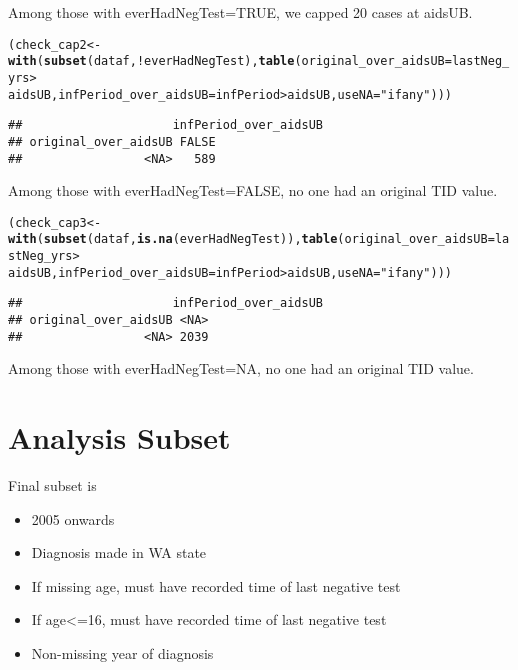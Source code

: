 \documentclass{article}\usepackage[]{graphicx}\usepackage[]{color}
\makeatletter
\newcommand{\hlstr}[1]{\textcolor[rgb]{0.192,0.494,0.8}{#1}}%
\newcommand{\hlopt}[1]{\textcolor[rgb]{0,0,0}{#1}}%
\newcommand{\hlstd}[1]{\textcolor[rgb]{0.345,0.345,0.345}{#1}}%
\newcommand{\hlkwb}[1]{\textcolor[rgb]{0.69,0.353,0.396}{#1}}%
\newcommand{\hlkwc}[1]{\textcolor[rgb]{0.333,0.667,0.333}{#1}}%
\newcommand{\hlkwd}[1]{\textcolor[rgb]{0.737,0.353,0.396}{\textbf{#1}}}%
\newenvironment{kframe}{%
 \def\at@end@of@kframe{}%
 \ifinner\ifhmode%
  \def\at@end@of@kframe{\end{minipage}}%
  \begin{minipage}{\columnwidth}%
 \fi\fi%
 \def\FrameCommand##1{\hskip\@totalleftmargin \hskip-\fboxsep
 \colorbox{shadecolor}{##1}\hskip-\fboxsep
     \hskip-\linewidth \hskip-\@totalleftmargin \hskip\columnwidth}%
 \MakeFramed {\advance\hsize-\width
   \@totalleftmargin\z@ \linewidth\hsize
   \@setminipage}}%
 {\par\unskip\endMakeFramed%
 \at@end@of@kframe}
\newenvironment{knitrout}{}{} %
\makeatother
\begin{document}
Among those with everHadNegTest=TRUE, we capped 20 cases at aidsUB.

\begin{knitrout}
\color{fgcolor}\begin{kframe}
\begin{alltt}
\hlstd{(check_cap2} \hlkwb{<-} \hlkwd{with}\hlstd{(}\hlkwd{subset}\hlstd{(dataf,} \hlopt{!}\hlstd{everHadNegTest),} \hlkwd{table}\hlstd{(}\hlkwc{original_over_aidsUB} \hlstd{= lastNeg_yrs} \hlopt{>}
    \hlstd{aidsUB,} \hlkwc{infPeriod_over_aidsUB} \hlstd{= infPeriod} \hlopt{>} \hlstd{aidsUB,} \hlkwc{useNA} \hlstd{=} \hlstr{"ifany"}\hlstd{)))}
\end{alltt}
\begin{verbatim}
##                     infPeriod_over_aidsUB
## original_over_aidsUB FALSE
##                 <NA>   589
\end{verbatim}
\end{kframe}
\end{knitrout}

Among those with everHadNegTest=FALSE, no one had an original TID value.

\begin{knitrout}
\color{fgcolor}\begin{kframe}
\begin{alltt}
\hlstd{(check_cap3} \hlkwb{<-} \hlkwd{with}\hlstd{(}\hlkwd{subset}\hlstd{(dataf,} \hlkwd{is.na}\hlstd{(everHadNegTest)),} \hlkwd{table}\hlstd{(}\hlkwc{original_over_aidsUB} \hlstd{= lastNeg_yrs} \hlopt{>}
    \hlstd{aidsUB,} \hlkwc{infPeriod_over_aidsUB} \hlstd{= infPeriod} \hlopt{>} \hlstd{aidsUB,} \hlkwc{useNA} \hlstd{=} \hlstr{"ifany"}\hlstd{)))}
\end{alltt}
\begin{verbatim}
##                     infPeriod_over_aidsUB
## original_over_aidsUB <NA>
##                 <NA> 2039
\end{verbatim}
\end{kframe}
\end{knitrout}

Among those with everHadNegTest=NA, no one had an original TID value.

\section{Analysis Subset}

Final subset is 
\begin{itemize}
    \item 2005 onwards
    \item Diagnosis made in WA state
    \item If missing age, must have recorded time of last negative test
    \item If age<=16, must have recorded time of last negative test
    \item Non-missing year of diagnosis
\end{itemize}
\end{document}
